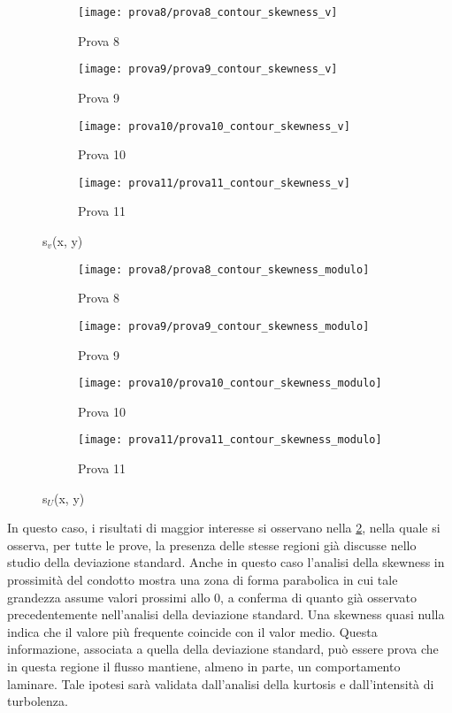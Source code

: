 \documentclass{article} %
\begin{document}
\begin{figure}[h!]
	\centering
	\begin{subfigure}[b]{0.24\textwidth}
		\texttt{[image: prova8/prova8\_contour\_skewness\_v]}
		\caption{Prova 8}
	\end{subfigure}
	\begin{subfigure}[b]{0.24\textwidth}
		\texttt{[image: prova9/prova9\_contour\_skewness\_v]}
		\caption{Prova 9}
	\end{subfigure}
	\begin{subfigure}[b]{0.24\textwidth}
		\texttt{[image: prova10/prova10\_contour\_skewness\_v]}
		\caption{Prova 10}
	\end{subfigure}
	\begin{subfigure}[b]{0.24\textwidth}
		\texttt{[image: prova11/prova11\_contour\_skewness\_v]}
		\caption{Prova 11}
	\end{subfigure}
	\caption{s$_v$(x, y)}
	\label{fig:contour_skewness_v_8901}
\end{figure}
\begin{figure}[h!]
	\centering
	\begin{subfigure}[b]{0.24\textwidth}
		\texttt{[image: prova8/prova8\_contour\_skewness\_modulo]}
		\caption{Prova 8}
	\end{subfigure}
	\begin{subfigure}[b]{0.24\textwidth}
		\texttt{[image: prova9/prova9\_contour\_skewness\_modulo]}
		\caption{Prova 9}
	\end{subfigure}
	\begin{subfigure}[b]{0.24\textwidth}
		\texttt{[image: prova10/prova10\_contour\_skewness\_modulo]}
		\caption{Prova 10}
	\end{subfigure}
	\begin{subfigure}[b]{0.24\textwidth}
		\texttt{[image: prova11/prova11\_contour\_skewness\_modulo]}
		\caption{Prova 11}
	\end{subfigure}
	\caption{s$_U$(x, y)}
	\label{fig:contour_skewness_modulo_8901}
\end{figure}\par
In questo caso, i risultati di maggior interesse si osservano nella \cref{fig:contour_skewness_modulo_8901}, nella quale si osserva, per tutte le prove, la presenza delle stesse regioni già discusse nello studio della deviazione standard. Anche in questo caso l'analisi della skewness in prossimità del condotto mostra una zona di forma parabolica in cui tale grandezza assume valori prossimi allo 0, a conferma di quanto già osservato precedentemente nell'analisi della deviazione standard. Una skewness quasi nulla indica che il valore più frequente coincide con il valor medio. Questa informazione, associata a quella della deviazione standard, può essere prova che in questa regione il flusso mantiene, almeno in parte, un comportamento laminare. Tale ipotesi sarà validata dall'analisi della kurtosis e dall'intensità di turbolenza.\par
\end{document}
